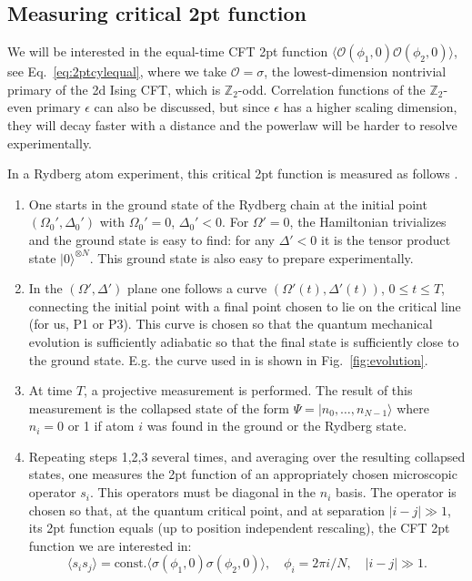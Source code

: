 \documentclass[a4paper,11pt]{article}
\theoremstyle{remark}
\theoremstyle{theorem}
\begin{document}
\subsection{Measuring critical 2pt function}\label{sec:measuring-critical-2pt-point-function}

We will be interested in the equal-time CFT 2pt function $\langle
\mathcal{O}(\phi_1, 0)\mathcal{O}(\phi_2, 0) \rangle$, see
Eq.~\eqref{eq:2ptcylequal}, where we take $\mathcal{O}= \sigma$, the
lowest-dimension nontrivial primary of the 2d Ising CFT, which is $\mathbb{Z}_2$-odd. Correlation functions
of the $\mathbb{Z}_2$-even primary $\epsilon$ can also be discussed, but since $\epsilon$ has a higher scaling
dimension, they will decay faster with a distance and the powerlaw will be
harder to resolve experimentally.

In a Rydberg atom experiment, this critical 2pt function is measured as
follows {\cite{Fang:2024uyf}}.
\begin{enumerate}
	\item One starts in the ground state of the Rydberg chain at the initial
	point $(\Omega_0', \Delta_0')$ with $\Omega_0' = 0$, $\Delta_0' < 0$. For
	$\Omega' = 0$, the Hamiltonian trivializes and the ground state is easy to
	find: for any $\Delta' < 0$ it is the tensor product state $| 0
	\rangle^{\otimes N}$. This ground state is also easy to prepare
	experimentally.
	
	\item In the $(\Omega', \Delta')$ plane one follows a curve $(\Omega' (t), \Delta' (t))$, $0 \leqslant t
	\leqslant T$, connecting the initial
	point with a final point chosen to lie on the critical line (for us, P1 or
	P3). This curve is chosen so that the quantum mechanical evolution is
	sufficiently adiabatic so that the final state is sufficiently close to the
	ground state. E.g. the curve used in {\cite{Fang:2024uyf}} is shown in
	Fig.~\ref{fig:evolution}.
		
	\item At time $T$, a projective measurement is performed. The result of this
	measurement is the collapsed state of the form $\Psi  = | n_0, \ldots, n_{N-1}
	\rangle$ where $n_i = 0$ or 1 if atom $i$ was found in the ground or the
	Rydberg state.
	
	\item Repeating steps 1,2,3 several times, and averaging over the resulting
	collapsed states, one measures the 2pt function of an appropriately chosen
	microscopic operator $s_i$. This operators must be diagonal in the $n_i$
	basis. The operator is chosen so that, at the quantum critical point, and at
	separation $| i - j | \gg 1$, its 2pt function equals (up to position
	independent rescaling), the CFT 2pt function we are interested in:
	\begin{equation}
		\langle s_i s_j \rangle =\text{const.} \langle \sigma
		(\phi_1, 0) \sigma (\phi_2, 0) \rangle, \quad \phi_i = 2 \pi i / N, \quad
		| i - j | \gg 1. \label{ssCFT}
	\end{equation}
\end{enumerate}
\end{document}
